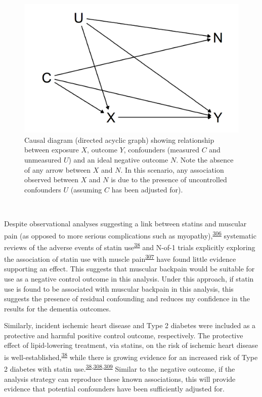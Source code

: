 \documentclass[a4paper, twoside]{templates/ociamthesis}
\begin{document}
\begin{figure}[H]

{\centering \includegraphics[width=0.8\linewidth]{figures/cprd-analysis/negativeOutcome} 

}

\caption[Causal diagram for ideal negative outcome]{Causal diagram (directed acyclic graph) showing relationship between exposure \(X\), outcome \(Y\), confounders (measured \(C\) and unmeasured \(U\)) and an ideal negative outcome \(N\). Note the absence of any arrow between \(X\) and \(N\). In this scenario, any association observed between \(X\) and \(N\) is due to the presence of uncontrolled confounders \(U\) (assuming \(C\) has been adjusted for).}\label{fig:negativeOutcome}
\end{figure}

~

Despite observational analyses suggesting a link between statins and muscular pain (as opposed to more serious complications such as myopathy),\textsuperscript{\protect\hyperlink{ref-selva-ocallaghan2018}{306}} systematic reviews of the adverse events of statin use\textsuperscript{\protect\hyperlink{ref-collins2016}{38}} and N-of-1 trials explicitly exploring the association of statin use with muscle pain\textsuperscript{\protect\hyperlink{ref-herrett2021}{307}} have found little evidence supporting an effect. This suggests that muscular backpain would be suitable for use as a negative control outcome in this analysis. Under this approach, if statin use is found to be associated with muscular backpain in this analysis, this suggests the presence of residual confounding and reduces my confidence in the results for the dementia outcomes.

Similarly, incident ischemic heart disease and Type 2 diabetes were included as a protective and harmful positive control outcome, respectively. The protective effect of lipid-lowering treatment, via statins, on the risk of ischemic heart disease is well-established,\textsuperscript{\protect\hyperlink{ref-collins2016}{38}} while there is growing evidence for an increased risk of Type 2 diabetes with statin use.\textsuperscript{\protect\hyperlink{ref-collins2016}{38},\protect\hyperlink{ref-macedo2014}{308},\protect\hyperlink{ref-smit2020}{309}} Similar to the negative outcome, if the analysis strategy can reproduce these known associations, this will provide evidence that potential confounders have been sufficiently adjusted for.
\end{document}
